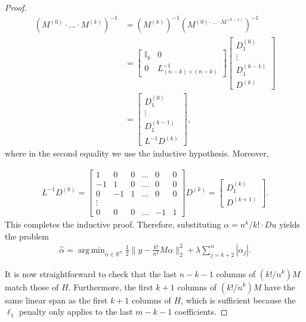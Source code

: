 \documentclass[a4paper]{article}
\DeclareMathOperator*{\argmin}{arg\,min}
\newcommand{\RR}{\mathbb{R}}
\begin{document}
\begin{proof}
\begin{align*}
(M^{(0)} \cdot \ldots \cdot M^{(k)})^{-1} &= (M^{(k)})^{-1} (M^{(0)\cdot\ldots\cdot M^{(k-1)}})^{-1}\\
&= 
\begin{bmatrix}
\mathbb{I}_k & 0\\
0 & L^{-1}_{(n-k)\times (n-k)}
\end{bmatrix}
\begin{bmatrix}
D_1^{(0)}\\
\vdots\\
D_1^{(k-1)}\\
D^{(k)}
\end{bmatrix}\\
&= 
\begin{bmatrix}
D_1^{(0)}\\
\vdots\\
D_1^{(k-1)}\\
L^{-1}D^{(k)}
\end{bmatrix},
\end{align*}
where in the second equality we use the inductive hypothesis. Moreover, 

\begin{align*}
L^{-1}D^{(k)} = 
\begin{bmatrix}
1 & 0 & 0 & \ldots & 0 & 0\\
-1 & 1 & 0 & \ldots & 0 & 0\\
0 & -1 & 1 & \ldots & 0 & 0\\
\vdots\\
0 & 0 & 0 & \ldots & -1 & 1
\end{bmatrix}
D^{(k)} = 
\begin{bmatrix}
D_1^{(k)}\\
D^{(k+1)}
\end{bmatrix}.
\end{align*}
This completes the inductive proof. Therefore, substituting $\alpha = n^k/k!\cdot Du$ yields the problem
\begin{align*}
\hat{\alpha} = \argmin_{\alpha\in\RR^n} \frac{1}{2}\|y-\frac{k!}{n^k}M\alpha\|_2^2 + \lambda\sum_{j=k+2}^n|\alpha_j|.
\end{align*}

It is now straightforward to check that the last $n-k-1$ columns of $(k!/n^k)M$ match those of $H$. Furthermore, the first $k+1$ columns of $(k!/n^k)M$ have the same linear span as the first $k+1$ columns of $H$, which is sufficient because the $\ell_1$ penalty only applies to the last $m-k-1$ coefficients. 
\end{proof}
\end{document}
